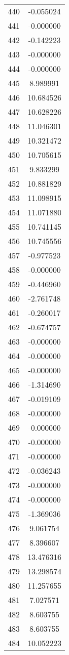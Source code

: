 \documentclass[12pt]{article}
\begin{document}
\begin{longtable}{@{}cc@{}}
440 & -0.055024 \\
441 & -0.000000 \\
442 & -0.142223 \\
443 & -0.000000 \\
444 & -0.000000 \\
445 & 8.989991 \\
446 & 10.684526 \\
447 & 10.628226 \\
448 & 11.046301 \\
449 & 10.321472 \\
450 & 10.705615 \\
451 & 9.833299 \\
452 & 10.881829 \\
453 & 11.098915 \\
454 & 11.071880 \\
455 & 10.741145 \\
456 & 10.745556 \\
457 & -0.977523 \\
458 & -0.000000 \\
459 & -0.446960 \\
460 & -2.761748 \\
461 & -0.260017 \\
462 & -0.674757 \\
463 & -0.000000 \\
464 & -0.000000 \\
465 & -0.000000 \\
466 & -1.314690 \\
467 & -0.019109 \\
468 & -0.000000 \\
469 & -0.000000 \\
470 & -0.000000 \\
471 & -0.000000 \\
472 & -0.036243 \\
473 & -0.000000 \\
474 & -0.000000 \\
475 & -1.369036 \\
476 & 9.061754 \\
477 & 8.396607 \\
478 & 13.476316 \\
479 & 13.298574 \\
480 & 11.257655 \\
481 & 7.027571 \\
482 & 8.603755 \\
483 & 8.603755 \\
484 & 10.052223 \\

\end{longtable}
\end{document}
